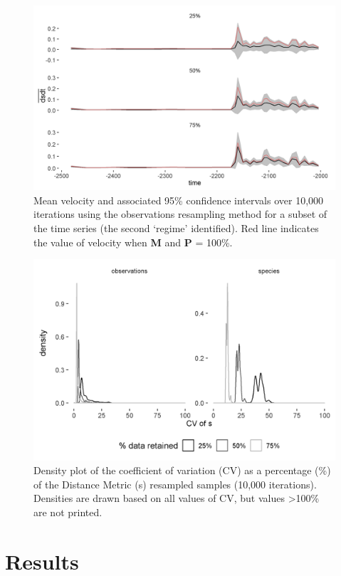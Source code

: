 \documentclass[print]{nuthesis}
\begin{document}
\begin{figure}
\includegraphics[width=0.75\linewidth]{./chapterFiles/resampling/figsCalledInDiss/dsdt_observations_ribboned_facetByProb_regime2} \caption{Mean velocity and associated 95\% confidence intervals over 10,000 iterations using the observations resampling method for a subset of the time series (the second `regime' identified). Red line indicates the value of velocity when \textbf{M} and \textbf{P} = 100\%.}\label{fig:dsdtResampRegime2}
\end{figure}

\begin{figure}
\includegraphics[width=0.85\linewidth]{./chapterFiles/resampling/figsCalledInDiss/s_cvDensity} \caption{Density plot of the coefficient of variation (CV) as a percentage (\%) of the Distance Metric (s) resampled samples (10,000 iterations). Densities are drawn based on all values of CV, but values \textgreater100\% are not printed.}\label{fig:sCV}
\end{figure}
\hypertarget{results-2}{%
\section{Results}\label{results-2}}
\end{document}
